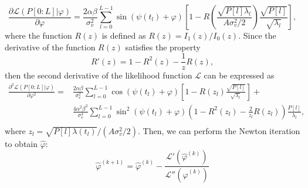 \documentclass[12pt,draftclsnofoot,journal,onecolumn]{IEEEtran}
\theoremstyle{nonumberplain}
\begin{document}
    \begin{equation}
        \frac{\partial \mathcal{L}(P[0:L] | \varphi)}{\partial \varphi} = \frac{2\alpha\beta}{\sigma_v^2}\sum_{l=0}^{L-1}\sin(\psi(t_l)+\varphi) \left[1 - R\left( \frac{\sqrt{P[l]\lambda_l}}{A\sigma_v^2/2} \right) \frac{\sqrt{P[l]}}{\sqrt{\lambda_l}}\right],
    \end{equation}
    where the function $R(z)$ is defined as $R(z) = I_1(z)/I_0(z)$. Since the derivative of the function $R(z)$ satisfies the property
    \begin{equation}
        R'(z)=1-R^2(z)-\frac{1}{z}R(z),
    \end{equation}
    then the second derivative of the likelihood function $\mathcal{L}$ can be expressed as
    \begin{equation}
        \begin{aligned}
        \frac{\partial^2 \mathcal{L}(P[0:L] | \varphi)}{\partial \varphi^2}  = &  \frac{2\alpha\beta}{\sigma_v^2} \sum_{l=0}^{L-1}{\cos(\psi(t_l)+\varphi)}\left[1 - R\left(z_l\right) \frac{\sqrt{P[l]}}{\sqrt{\lambda_l}}\right] + \\
        & \frac{4\alpha^2\beta^2}{\sigma_v^4}\sum_{l=0}^{L-1}{\sin^2(\psi(t_l)+\varphi) \left(1-R^2(z_l) -\frac{2}{z_l}R(z_l)\right)\frac{P[l]}{\lambda_l} },\\
        \end{aligned}
        \label{Second Derivative Likelihood}
    \end{equation}
    where $z_l = \sqrt{P[l]\lambda(t_l)}/(A\sigma_v^2/2)$. Then, we can perform the Newton iteration to obtain $\hat{\varphi}$:
    \begin{equation}
        \hat{\varphi}^{(k+1)} = \hat{\varphi}^{(k)} - \frac{\mathcal{L}'(\hat{\varphi}^{(k)})}{\mathcal{L}''(\hat{\varphi}^{(k)})}
    \end{equation}
\end{document}
